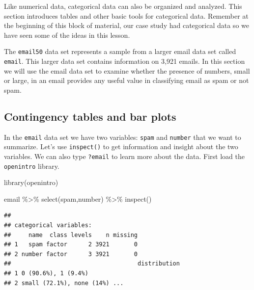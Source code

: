 \documentclass[
]{book}
\newenvironment{Shaded}{\begin{snugshade}}{\end{snugshade}}
\newcommand{\FunctionTok}[1]{\textcolor[rgb]{0.00,0.00,0.00}{#1}}
\newcommand{\NormalTok}[1]{#1}
\newcommand{\SpecialCharTok}[1]{\textcolor[rgb]{0.00,0.00,0.00}{#1}}
\begin{document}
Like numerical data, categorical data can also be organized and analyzed. This section introduces tables and other basic tools for categorical data. Remember at the beginning of this block of material, our case study had categorical data so we have seen some of the ideas in this lesson.

The \texttt{email50} data set represents a sample from a larger email data set called \texttt{email}. This larger data set contains information on 3,921 emails. In this section we will use the email data set to examine whether the presence of numbers, small or large, in an email provides any useful value in classifying email as spam or not spam.

\hypertarget{contingency-tables-and-bar-plots}{%
\subsection{Contingency tables and bar plots}\label{contingency-tables-and-bar-plots}}

In the \texttt{email} data set we have two variables: \texttt{spam} and \texttt{number} that we want to summarize. Let's use \texttt{inspect()} to get information and insight about the two variables. We can also type \texttt{?email} to learn more about the data. First load the \texttt{openintro} library.

\begin{Shaded}
\begin{Highlighting}[]
\FunctionTok{library}\NormalTok{(openintro)}
\end{Highlighting}
\end{Shaded}

\begin{Shaded}
\begin{Highlighting}[]
\NormalTok{email }\SpecialCharTok{\%\textgreater{}\%}
  \FunctionTok{select}\NormalTok{(spam,number) }\SpecialCharTok{\%\textgreater{}\%}
  \FunctionTok{inspect}\NormalTok{()}
\end{Highlighting}
\end{Shaded}

\begin{verbatim}
## 
## categorical variables:  
##     name  class levels    n missing
## 1   spam factor      2 3921       0
## 2 number factor      3 3921       0
##                                    distribution
## 1 0 (90.6%), 1 (9.4%)                          
## 2 small (72.1%), none (14%) ...
\end{verbatim}
\end{document}
